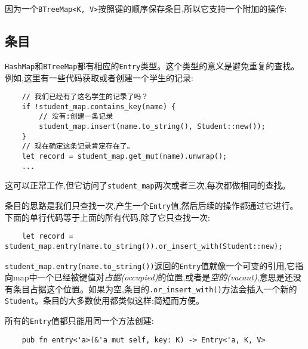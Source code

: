 因为一个\texttt{BTreeMap<K, V>}按照键的顺序保存条目,所以它支持一个附加的操作:

\subsection{条目}\label{entry}
\texttt{HashMap}和\texttt{BTreeMap}都有相应的\texttt{Entry}类型。这个类型的意义是避免重复的查找。例如,这里有一些代码获取或者创建一个学生的记录:
\begin{verbatim}
    // 我们已经有了这名学生的记录了吗？
    if !student_map.contains_key(name) {
        // 没有:创建一条记录
        student_map.insert(name.to_string(), Student::new());
    }
    // 现在确定这条记录肯定存在了。
    let record = student_map.get_mut(name).unwrap();
    ...
\end{verbatim}

这可以正常工作,但它访问了\texttt{student\_map}两次或者三次,每次都做相同的查找。

条目的思路是我们只查找一次,产生一个\texttt{Entry}值,然后后续的操作都通过它进行。下面的单行代码等于上面的所有代码,除了它只查找一次:
\begin{verbatim}
    let record = student_map.entry(name.to_string()).or_insert_with(Student::new);
\end{verbatim}

\texttt{student\_map.entry(name.to\_string())}返回的\texttt{Entry}值就像一个可变的引用,它指向map中一个已经被键值对\emph{占据(occupied)}的位置,或者是\emph{空的(vacant)},意思是还没有条目占据这个位置。如果为空,条目的\texttt{.or\_insert\_with()}方法会插入一个新的\texttt{Student}。条目的大多数使用都类似这样:简短而方便。

所有的\texttt{Entry}值都只能用同一个方法创建:

\begin{verbatim}
    pub fn entry<'a>(&'a mut self, key: K) -> Entry<'a, K, V>
\end{verbatim}

